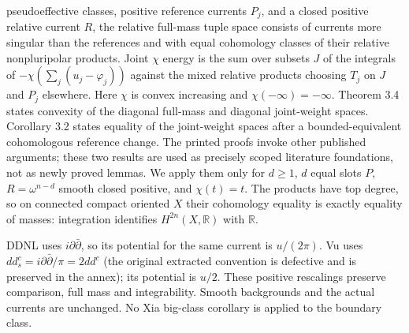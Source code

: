\documentclass[
  11pt,
]{article}
\begin{document}
\begin{itemize}
  pseudoeffective classes, positive reference currents \(P_j\), and a
  closed positive relative current \(R\), the relative full-mass tuple
  space consists of currents more singular than the references and with
  equal cohomology classes of their relative nonpluripolar products.
  Joint \(\chi\) energy is the sum over subsets \(J\) of the integrals
  of \(-\chi(\sum_j(u_j-\varphi_j))\) against the mixed relative
  products choosing \(T_j\) on \(J\) and \(P_j\) elsewhere. Here
  \(\chi\) is convex increasing and \(\chi(-\infty)=-\infty\). Theorem
  3.4 states convexity of the diagonal full-mass and diagonal
  joint-weight spaces. Corollary 3.2 states equality of the joint-weight
  spaces after a bounded-equivalent cohomologous reference change. The
  printed proofs invoke other published arguments; these two results are
  used as precisely scoped literature foundations, not as newly proved
  lemmas. We apply them only for \(d\geq1\), \(d\) equal slots \(P\),
  \(R=\omega^{n-d}\) smooth closed positive, and \(\chi(t)=t\). The
  products have top degree, so on connected compact oriented \(X\) their
  cohomology equality is exactly equality of masses: integration
  identifies \(H^{2n}(X,\mathbb R)\) with \(\mathbb R\).
\end{itemize}

DDNL uses \(i\partial\bar\partial\), so its potential for the same
current is \(u/(2\pi)\). Vu uses
\(dd^c_s=i\partial\bar\partial/\pi=2dd^c\) (the original extracted
convention is defective and is preserved in the annex); its potential is
\(u/2\). These positive rescalings preserve comparison, full mass and
integrability. Smooth backgrounds and the actual currents are unchanged.
No Xia big-class corollary is applied to the boundary class.
\end{document}
